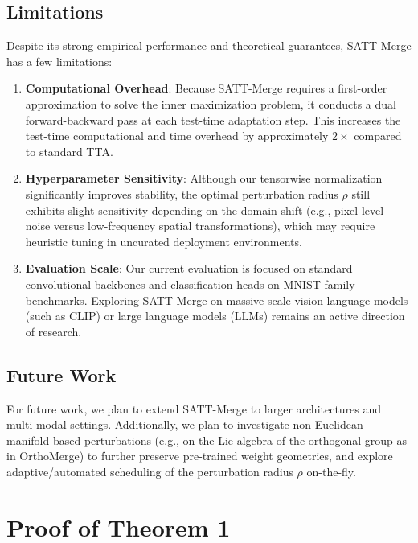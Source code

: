 \documentclass{article}
\begin{document}
\subsection{Limitations}
Despite its strong empirical performance and theoretical guarantees, SATT-Merge has a few limitations:
\begin{enumerate}
    \item \textbf{Computational Overhead}: Because SATT-Merge requires a first-order approximation to solve the inner maximization problem, it conducts a dual forward-backward pass at each test-time adaptation step. This increases the test-time computational and time overhead by approximately $2\times$ compared to standard TTA.
    \item \textbf{Hyperparameter Sensitivity}: Although our tensorwise normalization significantly improves stability, the optimal perturbation radius $\rho$ still exhibits slight sensitivity depending on the domain shift (e.g., pixel-level noise versus low-frequency spatial transformations), which may require heuristic tuning in uncurated deployment environments.
    \item \textbf{Evaluation Scale}: Our current evaluation is focused on standard convolutional backbones and classification heads on MNIST-family benchmarks. Exploring SATT-Merge on massive-scale vision-language models (such as CLIP) or large language models (LLMs) remains an active direction of research.
\end{enumerate}

\subsection{Future Work}
For future work, we plan to extend SATT-Merge to larger architectures and multi-modal settings. Additionally, we plan to investigate non-Euclidean manifold-based perturbations (e.g., on the Lie algebra of the orthogonal group as in OrthoMerge) to further preserve pre-trained weight geometries, and explore adaptive/automated scheduling of the perturbation radius $\rho$ on-the-fly.




\clearpage
\appendix
\onecolumn

\section{Proof of Theorem 1}
\label{appendix:proof}
\end{document}
